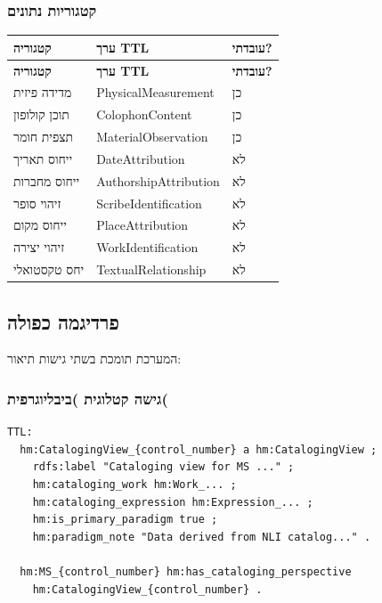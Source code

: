 \documentclass[12pt,a4paper]{article}
\begin{document}
\subsubsection{קטגוריות נתונים}

\begin{longtable}{|p{4cm}|L{5cm}|L{7cm}|}
\hline
\textbf{קטגוריה} & \textbf{ערך TTL} & \textbf{עובדתי?} \\
\hline
\endfirsthead
\hline
\textbf{קטגוריה} & \textbf{ערך TTL} & \textbf{עובדתי?} \\
\hline
\endhead
\hline
\endfoot
מדידה פיזית & PhysicalMeasurement & כן \\
\hline
תוכן קולופון & ColophonContent & כן \\
\hline
תצפית חומר & MaterialObservation & כן \\
\hline
ייחוס תאריך & DateAttribution & לא \\
\hline
ייחוס מחברות & AuthorshipAttribution & לא \\
\hline
זיהוי סופר & ScribeIdentification & לא \\
\hline
ייחוס מקום & PlaceAttribution & לא \\
\hline
זיהוי יצירה & WorkIdentification & לא \\
\hline
יחס טקסטואלי & TextualRelationship & לא \\
\hline
\end{longtable}

\subsection{פרדיגמה כפולה}

המערכת תומכת בשתי גישות תיאור:

\subsubsection{גישה קטלוגית )ביבליוגרפית(}

\begin{LTR}
\begin{verbatim}
TTL:
  hm:CatalogingView_{control_number} a hm:CatalogingView ;
    rdfs:label "Cataloging view for MS ..." ;
    hm:cataloging_work hm:Work_... ;
    hm:cataloging_expression hm:Expression_... ;
    hm:is_primary_paradigm true ;
    hm:paradigm_note "Data derived from NLI catalog..." .
  
  hm:MS_{control_number} hm:has_cataloging_perspective
    hm:CatalogingView_{control_number} .
\end{verbatim}
\end{LTR}
\end{document}
